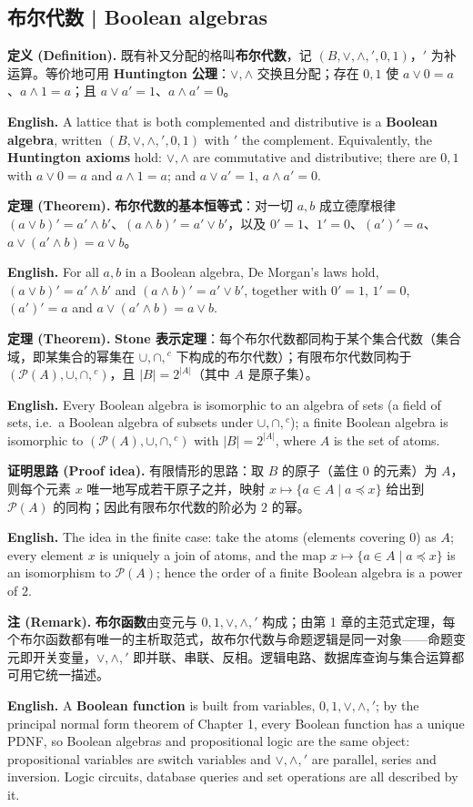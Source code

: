 \documentclass[UTF8,11pt,a4paper]{ctexart}
\newcommand{\EN}[1]{\par\noindent \textbf{English.} #1\par}
\newcommand{\DEF}[2]{\par\noindent\textbf{定义 (Definition).} #1\par\EN{#2}}
\newcommand{\THM}[2]{\par\noindent\textbf{定理 (Theorem).} #1\par\EN{#2}}
\newcommand{\PRF}[2]{\par\noindent\textbf{证明思路 (Proof idea).} #1\par\EN{#2}}
\newcommand{\REM}[2]{\par\noindent\textbf{注 (Remark).} #1\par\EN{#2}}
\begin{document}
\subsection{布尔代数 | Boolean algebras}
\DEF{既有补又分配的格叫\textbf{布尔代数}，记 $(B,\vee,\wedge,{}',0,1)$，$'$ 为补运算。等价地可用 \textbf{Huntington 公理}：$\vee,\wedge$ 交换且分配；存在 $0,1$ 使 $a\vee0=a$、$a\wedge1=a$；且 $a\vee a'=1$、$a\wedge a'=0$。}{A lattice that is both complemented and distributive is a \textbf{Boolean algebra}, written $(B,\vee,\wedge,{}',0,1)$ with $'$ the complement. Equivalently, the \textbf{Huntington axioms} hold: $\vee,\wedge$ are commutative and distributive; there are $0,1$ with $a\vee0=a$ and $a\wedge1=a$; and $a\vee a'=1$, $a\wedge a'=0$.}
\THM{\textbf{布尔代数的基本恒等式}：对一切 $a,b$ 成立德摩根律 $(a\vee b)'=a'\wedge b'$、$(a\wedge b)'=a'\vee b'$，以及 $0'=1$、$1'=0$、$(a')'=a$、$a\vee(a'\wedge b)=a\vee b$。}{For all $a,b$ in a Boolean algebra, De Morgan's laws hold, $(a\vee b)'=a'\wedge b'$ and $(a\wedge b)'=a'\vee b'$, together with $0'=1$, $1'=0$, $(a')'=a$ and $a\vee(a'\wedge b)=a\vee b$.}
\THM{\textbf{Stone 表示定理}：每个布尔代数都同构于某个集合代数（集合域，即某集合的幂集在 $\cup,\cap,{}^c$ 下构成的布尔代数）；有限布尔代数同构于 $(\mathcal P(A),\cup,\cap,{}^c)$，且 $|B|=2^{|A|}$（其中 $A$ 是原子集）。}{Every Boolean algebra is isomorphic to an algebra of sets (a field of sets, i.e.\ a Boolean algebra of subsets under $\cup,\cap,{}^c$); a finite Boolean algebra is isomorphic to $(\mathcal P(A),\cup,\cap,{}^c)$ with $|B|=2^{|A|}$, where $A$ is the set of atoms.}
\PRF{有限情形的思路：取 $B$ 的原子（盖住 $0$ 的元素）为 $A$，则每个元素 $x$ 唯一地写成若干原子之并，映射 $x\mapsto\{a\in A\mid a\preccurlyeq x\}$ 给出到 $\mathcal P(A)$ 的同构；因此有限布尔代数的阶必为 $2$ 的幂。}{The idea in the finite case: take the atoms (elements covering $0$) as $A$; every element $x$ is uniquely a join of atoms, and the map $x\mapsto\{a\in A\mid a\preccurlyeq x\}$ is an isomorphism to $\mathcal P(A)$; hence the order of a finite Boolean algebra is a power of $2$.}
\REM{\textbf{布尔函数}由变元与 $0,1,\vee,\wedge,{}'$ 构成；由第 1 章的主范式定理，每个布尔函数都有唯一的主析取范式，故布尔代数与命题逻辑是同一对象——命题变元即开关变量，$\vee,\wedge,{}'$ 即并联、串联、反相。逻辑电路、数据库查询与集合运算都可用它统一描述。}{A \textbf{Boolean function} is built from variables, $0,1,\vee,\wedge,{}'$; by the principal normal form theorem of Chapter 1, every Boolean function has a unique PDNF, so Boolean algebras and propositional logic are the same object: propositional variables are switch variables and $\vee,\wedge,{}'$ are parallel, series and inversion. Logic circuits, database queries and set operations are all described by it.}
\end{document}
